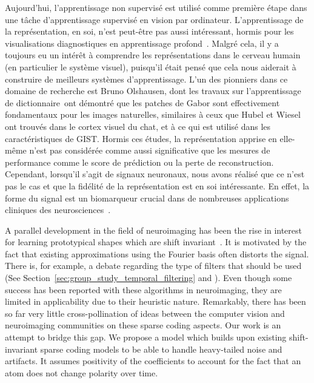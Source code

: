 Aujourd'hui, l'apprentissage non supervisé est utilisé comme première étape dans une tâche d'apprentissage supervisé en vision par ordinateur. L'apprentissage de la représentation, en soi, n'est peut-être pas aussi intéressant, hormis pour les visualisations diagnostiques en apprentissage profond~\citep{zeiler2014visualizing}. Malgré cela, il y a toujours eu un intérêt à comprendre les représentations dans le cerveau humain (en particulier le système visuel), puisqu’il était pensé que cela nous aiderait à construire de meilleurs systèmes d'apprentissage. L'un des pionniers dans ce domaine de recherche est Bruno Olshausen, dont les travaux sur l'apprentissage de dictionnaire~\citep{olshausen1996emergence}ont démontré que les patches de Gabor sont effectivement fondamentaux pour les images naturelles, similaires à ceux que Hubel et Wiesel~\citep{hubel1962receptive, marcelja1980mathematical} ont trouvés dans le cortex visuel du chat, et à ce qui est utilisé dans les caractéristiques de GIST. Hormis ces études, la représentation apprise en elle-même n'est pas considérée comme aussi significative que les mesures de performance comme le score de prédiction ou la perte de reconstruction. Cependant, lorsqu’il s’agit de signaux neuronaux, nous avons réalisé que ce n'est pas le cas et que la fidélité de la représentation est en soi intéressante. En effet, la forme du signal est un biomarqueur crucial dans de nombreuses applications cliniques des neurosciences~\citep{cole2017brain}. 

A parallel development in the field of neuroimaging has been the rise in interest for learning prototypical shapes which are shift invariant~\citep{jost2006motif, barthelemy2013multivariate, brockmeier2016learning, hitziger2017adaptive}. It is motivated by the fact that existing approximations using the Fourier basis often distorts the signal. There is, for example, a debate regarding the type of filters that should be used (See Section~\ref{sec:group_study_temporal_filtering} and \cite{widmann2015digital,parks1987digital,ifeachor2002digital, gotz-etal:15}). 
Even though some success has been reported
with these algorithms in neuroimaging, they are limited in applicability due to their heuristic nature.
Remarkably, there has been so far very little cross-pollination of ideas between the computer vision and neuroimaging communities on these sparse coding aspects. 
Our work is an attempt to bridge this gap. 
We propose a model which builds upon existing shift-invariant sparse coding models to be able to handle heavy-tailed noise and artifacts. It assumes positivity of the coefficients to account for the fact that an atom does not change polarity over time. 


